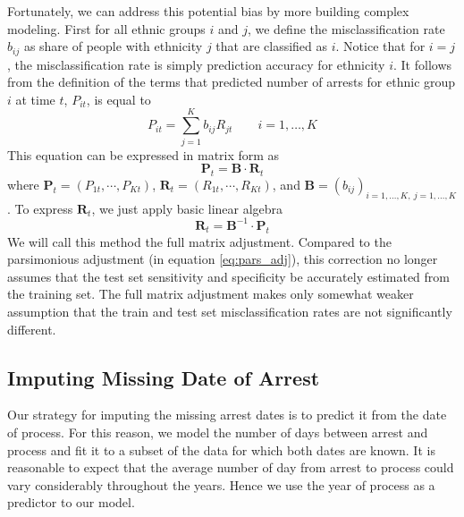 Fortunately, we can address this potential bias by more building complex modeling.
First for all ethnic groups $i$ and $j$, we define the misclassification rate $b_{ij}$ as share of people with ethnicity $j$ that are classified as $i$.
Notice that for $i = j$, the misclassification rate is simply prediction accuracy for ethnicity $i$.
It follows from the definition of the terms that predicted number of arrests for ethnic group $i$ at time $t$,  $P_{it}$, is equal to 
\begin{equation}
P_{it}  = \sum_{j = 1}^{K} b_{ij} R_{jt} \qquad i = 1, \dots, K
\end{equation}
This equation can be expressed in matrix form as
\begin{equation}
 \mathbf{P}_t = \mathbf{B} \cdot \mathbf{R}_t 
\end{equation}
where $\mathbf{P}_t = \left(P_{1t}, \cdots, P_{Kt} \right)$, $\mathbf{R}_t = \left(R_{1t}, \cdots, R_{Kt} \right)$, and $\mathbf{B} = \left(b_{ij}\right)_{i = 1, \dots, K,\:j = 1, \dots, K}$.
To express $\mathbf{R}_t$, we just  apply basic linear algebra
\begin{equation}
\mathbf{R}_t  = \mathbf{B}^{-1} \cdot  \mathbf{P}_t
\end{equation}
We will call this method the full matrix adjustment. Compared to the parsimonious adjustment (in equation \ref{eq:pars_adj}), this correction no longer assumes that the test set sensitivity and specificity be accurately estimated  from the training set.  The full matrix adjustment
makes only somewhat weaker assumption that the train and test set misclassification rates are not significantly different. 







\subsection{Imputing Missing Date of Arrest} \label{subsec:imputing_missing_date}
Our strategy for imputing the missing arrest dates is to  predict it from the date of process. For this reason, we model the number of days between arrest and process and fit it to a subset of the data for which both dates are known. It  is reasonable to expect that the average number of day from  arrest to process could  vary considerably throughout the years.    %
Hence we use the year of process as a predictor to our model. 


